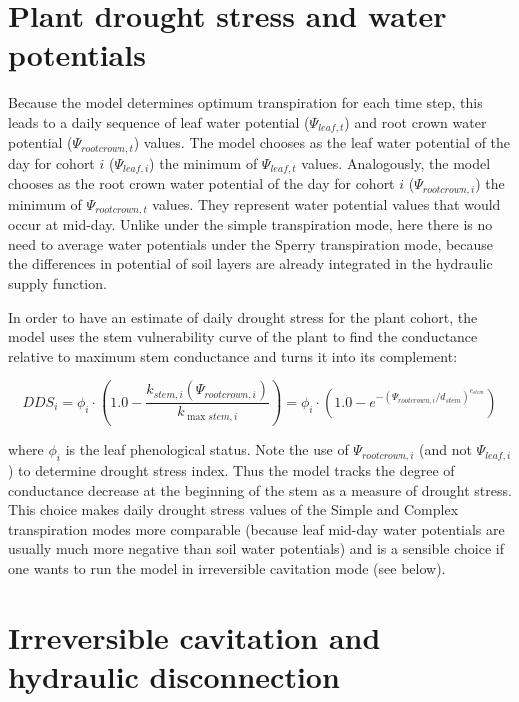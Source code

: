 \documentclass[]{book}
\begin{document}
\hypertarget{plant-drought-stress-and-water-potentials}{%
\section{Plant drought stress and water potentials}\label{plant-drought-stress-and-water-potentials}}

Because the model determines optimum transpiration for each time step, this leads to a daily sequence of leaf water potential (\(\Psi_{leaf,t}\)) and root crown water potential (\(\Psi_{rootcrown,t}\)) values. The model chooses as the leaf water potential of the day for cohort \(i\) (\(\Psi_{leaf,i}\)) the minimum of \(\Psi_{leaf,t}\) values. Analogously, the model chooses as the root crown water potential of the day for cohort \(i\) (\(\Psi_{rootcrown,i}\)) the minimum of \(\Psi_{rootcrown,t}\) values. They represent water potential values that would occur at mid-day. Unlike under the simple transpiration mode, here there is no need to average water potentials under the Sperry transpiration mode, because the differences in potential of soil layers are already integrated in the hydraulic supply function.

In order to have an estimate of daily drought stress for the plant cohort, the model uses the stem vulnerability curve of the plant to find the conductance relative to maximum stem conductance and turns it into its complement:

\begin{equation}
DDS_i = \phi_i \cdot \left( 1.0 - \frac{k_{stem, i}(\Psi_{rootcrown,i})}{k_{\max stem, i}}\right) = \phi_i \cdot \left(1.0 - e^{-(\Psi_{rootcrown,i}/d_{stem})^{c_{stem}}}\right)
\end{equation}

where \(\phi_i\) is the leaf phenological status. Note the use of \(\Psi_{rootcrown,i}\) (and not \(\Psi_{leaf,i}\)) to determine drought stress index. Thus the model tracks the degree of conductance decrease at the beginning of the stem as a measure of drought stress. This choice makes daily drought stress values of the Simple and Complex transpiration modes more comparable (because leaf mid-day water potentials are usually much more negative than soil water potentials) and is a sensible choice if one wants to run the model in irreversible cavitation mode (see below).

\hypertarget{irreversible-cavitation-and-hydraulic-disconnection-1}{%
\section{Irreversible cavitation and hydraulic disconnection}\label{irreversible-cavitation-and-hydraulic-disconnection-1}}
\end{document}
